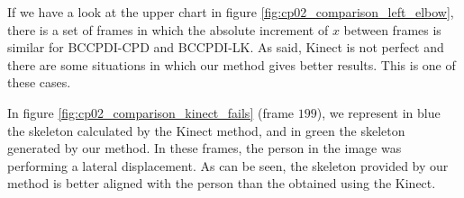 If we have a look at the upper chart in figure \ref{fig:cp02_comparison_left_elbow}, there is a set of frames in which the 
absolute increment of $x$ between frames is similar for BCCPDI-CPD and BCCPDI-LK. As said, Kinect is not perfect and 
there are some situations in which our method gives better results. This is one of these cases. 

In figure \ref{fig:cp02_comparison_kinect_fails} (frame $199$), we represent in blue the skeleton calculated by the 
Kinect method, and in green the skeleton generated by our method. In these frames, the person in the 
image was performing a lateral displacement. As can be seen, the skeleton provided by our method is better aligned with
the person than the obtained using the Kinect. 

\begin{figure}[t]
        \centering


\end{figure}
